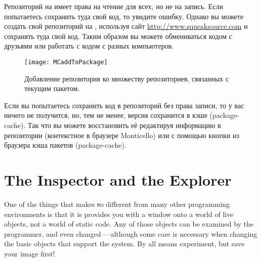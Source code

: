 \documentclass[a4paper,10pt,twoside]{book}
\begin{document}
Репозиторий  на \emphind{\sqsrc} имеет права на чтение для всех, но не на запись. Если попытаетесь сохранить туда свой код, то увидите ошибку. Однако вы можете создать свой репозиторий на \sqsrc, используя сайт \url{http://www.squeaksource.com} и сохранять туда свой код. Таким образом вы можете обмениваться кодом с друзьями или работать с кодом с разных компьютеров.

\begin{figure}[tbp]
	\begin{center}
		\texttt{[image: MCaddToPackage]}
	\end{center}
	\caption{Добавление репозитория ко множеству репозиториев, связанных с текущим пакетом.}
\end{figure}


Если вы попытаетесь сохранить код в репозиторий без права записи, то у вас ничего не получится, но, тем не менее, версия сохранится в кэше (package-cache). Так что вы можете восстановить её редактируя информацию в репозитории (контекстное в браузере Monticello) или с помощью кнопки  из браузера кэша пакетов (package-cache).

\section{The Inspector and the Explorer}

One of the things that makes \st so different from many other programming environments is that it is provides you with a window onto a world of live objects, not a world of static code.
Any of those objects can be examined by the programmer, and even changed\,---\,although some care is necessary when changing the basic objects that support the system.  
By all means experiment, but save your image first!
\end{document}
